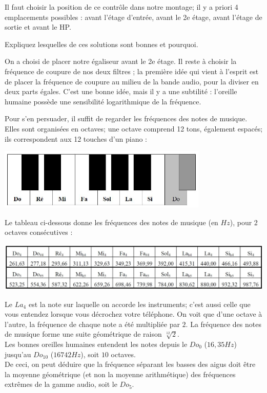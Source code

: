 Il faut choisir la position de ce contrôle dans notre montage; il y a priori 4 emplacements possibles : avant l'étage d'entrée, avant le 2e étage, avant l'étage de sortie et avant le HP.

{
Expliquez lesquelles de ces solutions sont bonnes et pourquoi.
}
{}

On a choisi de placer notre égaliseur avant le 2e étage.
Il reste à choisir la fréquence de coupure de nos deux filtres ; la première idée qui vient à l'esprit est de placer la fréquence de coupure au milieu de la bande audio, pour la diviser en deux parts égales.
C'est une bonne idée, mais il y a une subtilité : l'oreille humaine possède une sensibilité logarithmique de la fréquence.

Pour s'en persuader, il suffit de regarder les fréquences des notes de musique.
Elles sont organisées en octaves; une octave comprend 12 tons, également espacés; ils correspondent aux 12 touches d'un piano :
\begin{center}
\includegraphics[width=10cm]{figures/AOPpiano}
\end{center}

Le tableau ci-dessous donne les fréquences des notes de musique (en $Hz$), pour 2 octaves consécutives :
\begin{center}
\includegraphics[width=16cm]{figures/AOPpianotable}
\end{center}

Le $La_4$ est la note sur laquelle on accorde les instruments; c'est aussi celle que vous entendez lorsque vous décrochez votre téléphone. On voit que d'une octave à l'autre, la fréquence de chaque note a été multipliée par $2$. La fréquence des notes de musique forme une suite géométrique de raison $\sqrt[12]{2}$.\\
Les bonnes oreilles humaines entendent les notes depuis le $Do_0$ ($16,35Hz$) jusqu'au $Do_{10}$ ($16742Hz$), soit $10$ octaves.\\
De ceci, on peut déduire que la fréquence séparant les basses des aigus doit être la moyenne géométrique (et non la moyenne arithmétique) des fréquences extrêmes de la gamme audio, soit le $Do_5$.

